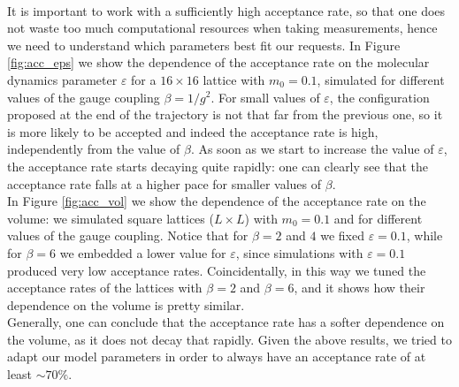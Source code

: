 \\ It is important to work with a sufficiently high acceptance rate, so that one does not waste too much computational resources when taking measurements, hence we need to understand which parameters best fit our requests.
In Figure \ref{fig:acc_eps} we show the dependence of the acceptance rate on the molecular dynamics parameter $\varepsilon$ for a $16 \times 16$ lattice with $m_0 = 0.1$, simulated for different values of the gauge coupling $\beta = 1/g^2$. For small values of $\varepsilon$, the configuration proposed at the end of the trajectory is not that far from the previous one, so it is more likely to be accepted and indeed the acceptance rate is high, independently from the value of $\beta$. As soon as we start to increase the value of $\varepsilon$, the acceptance rate starts decaying quite rapidly: one can clearly see that the acceptance rate falls at a higher pace for smaller values of $\beta.$ 
\\ In Figure \ref{fig:acc_vol} we show the dependence of the acceptance rate on the volume: we simulated square lattices ($L \times L$) with $m_0 = 0.1$ and for different values of the gauge coupling. Notice that for $\beta = 2$ and $4$ we fixed $\varepsilon = 0.1$, while for $\beta = 6$ we embedded a lower value for $\varepsilon$, since simulations with $\varepsilon = 0.1$ produced very low acceptance rates. Coincidentally, in this way we tuned the acceptance rates of the lattices with $\beta = 2$ and $\beta = 6$, and it shows how their dependence on the volume is pretty similar.
\\ Generally, one can conclude that the acceptance rate has a softer dependence on the volume, as it does not decay that rapidly.
Given the above results, we tried to adapt our model parameters in order to always have an acceptance rate of at least $\sim 70\%.$
